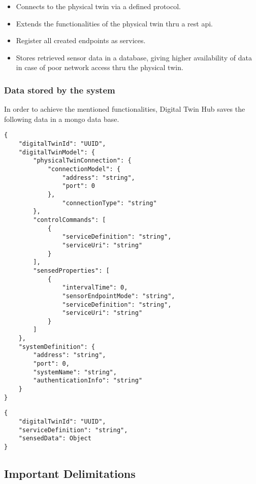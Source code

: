 \documentclass[a4paper]{arrowhead}
\begin{document}
\begin{itemize}
    \item Connects to the physical twin via a defined protocol.
    \item Extends the functionalities of the physical twin thru a rest api.
    \item Register all created endpoints as services.
    \item Stores retrieved sensor data in a database, giving higher availability of data in case of poor network access thru the physical twin.
\end{itemize}

\subsubsection {Data stored by the system}
In order to achieve the mentioned functionalities, Digital Twin Hub saves the following data in a mongo data base.

\begin{lstlisting}[label={lst:DigitalTwin},caption={Whats saved about a DigitalTwin.}]
{
    "digitalTwinId": "UUID",
    "digitalTwinModel": {
        "physicalTwinConnection": {
            "connectionModel": {
                "address": "string",
                "port": 0
            },
                "connectionType": "string"
        },
        "controlCommands": [
            {
                "serviceDefinition": "string",
                "serviceUri": "string"
            }
        ],
        "sensedProperties": [
            {
                "intervalTime": 0,
                "sensorEndpointMode": "string",
                "serviceDefinition": "string",
                "serviceUri": "string"
            }
        ]
    },
    "systemDefinition": {
        "address": "string",
        "port": 0,
        "systemName": "string",
        "authenticationInfo": "string"
    }
}
\end{lstlisting}

\begin{lstlisting}[label={lst:SensorData},caption={The saved SonsorData.}]
{
    "digitalTwinId": "UUID",
    "serviceDefinition": "string",
    "sensedData": Object
}
\end{lstlisting}

\subsection{Important Delimitations}
\label{sec:delimitations}
\end{document}
